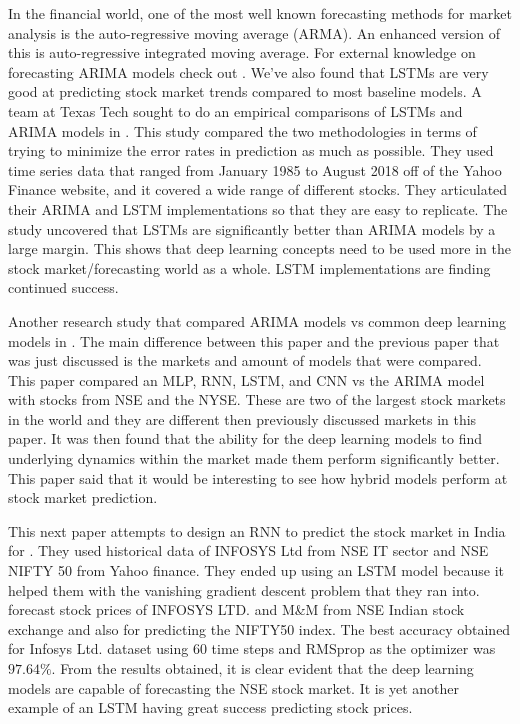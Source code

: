 \documentclass{article}
\theoremstyle{plain}
\theoremstyle{definition}
\numberwithin{equation}{section}
\numberwithin{theorem}{section}
\numberwithin{lemma}{section}
\numberwithin{definition}{section}
\numberwithin{proposition}{section}
\numberwithin{corollary}{section}
\begin{document}
	 
	 In the financial world, one of the most well known forecasting methods for market analysis is the auto-regressive moving average (ARMA). An enhanced version of this is auto-regressive integrated moving average. For external knowledge on forecasting ARIMA models check out \cite{prahakaran_2019}. We've also found that LSTMs are very good at predicting stock market trends compared to most baseline models. A team at Texas Tech sought to do an empirical comparisons of LSTMs and ARIMA models in \cite{Namini2018}. This study compared the two methodologies in terms of trying to minimize the error rates in prediction as much as possible. They used time series data that ranged from January 1985 to August 2018 off of the Yahoo Finance website, and it covered a wide range of different stocks. They articulated their ARIMA and LSTM implementations so that they are easy to replicate. The study uncovered that LSTMs are significantly better than ARIMA models by a large margin. This shows that deep learning concepts need to be used more in the stock market/forecasting world as a whole. LSTM implementations are finding continued success.
	 
	 
	 Another research study that compared ARIMA models vs common deep learning models in \cite{Hiransha2018}. The main difference between this paper and the previous paper that was just discussed is the markets and amount of models that were compared. This paper compared an MLP, RNN, LSTM, and CNN vs the ARIMA model with stocks from NSE and the NYSE. These are two of the largest stock markets in the world and they are different then previously discussed markets in this paper. It was then found that the ability for the deep learning models to find underlying dynamics within the market made them perform significantly better. This paper said that it would be interesting to see how hybrid models perform at stock market prediction.
	 
	 
	 This next paper attempts to design an RNN to predict the stock market in India for \cite{Sachdeva2019}. They used historical data of INFOSYS Ltd from NSE IT sector and NSE NIFTY 50 from Yahoo finance. They ended up using an LSTM model because it helped them with the vanishing gradient descent problem that they ran into. forecast stock prices of INFOSYS LTD. and M\&M from NSE Indian stock exchange and also for predicting the NIFTY50 index. The best accuracy obtained for Infosys Ltd. dataset using 60 time steps and RMSprop as the optimizer was $97.64\%$. From the results obtained, it is clear evident that the deep learning models are capable of forecasting the NSE stock market. It is yet another example of an LSTM having great success predicting stock prices.
	 
\end{document}
